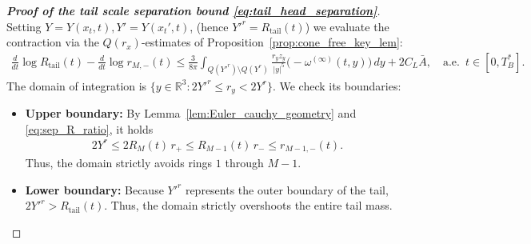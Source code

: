 \documentclass[reqno,11pt]{amsart}
\begin{document}
\begin{proof}[\textbf{Proof of the tail scale separation bound \eqref{eq:tail_head_separation}}]
Setting $Y=Y(x_t,t), Y'=Y(x_t',t)$, (hence $Y'^{r}=R_{\mathrm{tail}}(t)$)
we evaluate the contraction via the $Q(r_x)$-estimates of  Proposition~\ref{prop:cone_free_key_lem}:
\begin{align*}
    \frac{d}{dt} \log R_{\mathrm{tail}}(t) - \frac{d}{dt} \log r_{M,-}(t) \le \frac{3}{8\pi} \int_{Q(Y'^r) \setminus Q(Y^r)} \frac{r_y z_y}{|y|^5} \big(-\omega^{(\infty)}(t,y)\big) \, dy + 2C_L \bar A, \quad \text{a.e. }\, t\in [0,T_B^*].
\end{align*}
The domain of integration is $\{y \in \mathbb{R}^3 : 2 Y'^r \le r_y < 2 Y^r \}$. We check its boundaries:
\begin{itemize}
    \item \textbf{Upper boundary:} By Lemma~\ref{lem:Euler_cauchy_geometry} and \eqref{eq:sep_R_ratio}, it holds 
    \begin{align*}
    2 Y^r \le 2 R_M(t)  \, r_+\le R_{M-1}(t) \, r_-\leq r_{M-1,-}(t).
    \end{align*}
    Thus, the domain strictly avoids rings $1$ through $M-1$.
    \item \textbf{Lower boundary:} Because $Y'^r$ represents the outer boundary of the tail, $2 Y'^r> R_{\mathrm{tail}}(t)$.  Thus, the domain strictly overshoots the entire tail mass.
\end{itemize}


\end{proof}
\end{document}
